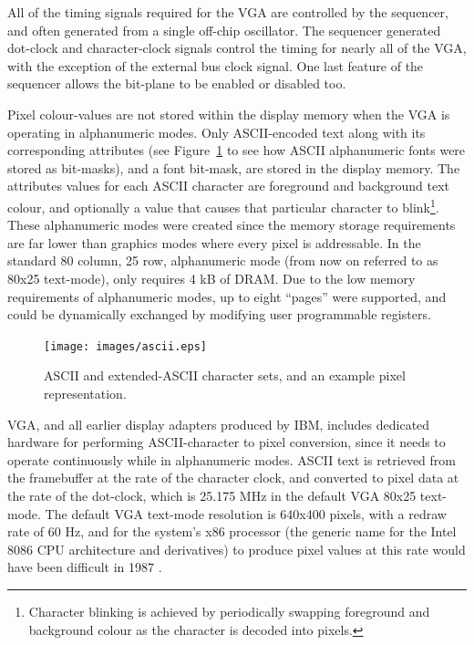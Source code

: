 All of the timing signals required for the VGA are controlled by the sequencer,
and often generated from a single off-chip oscillator. The sequencer generated
dot-clock and character-clock signals control the timing for nearly all of the
VGA, with the exception of the external bus clock signal. One last feature of the
sequencer allows the bit-plane to be enabled or disabled too.

Pixel colour-values are not stored within the display memory when the VGA is
operating in alphanumeric modes. Only ASCII-encoded text along with its
corresponding attributes (see Figure~\ref{INTRO_ASCII} to see how ASCII
alphanumeric fonts were stored as bit-masks), and a font bit-mask, are stored in
the display memory. The attributes values for each ASCII character are foreground
and background text colour, and optionally a value that causes that particular
character to blink\footnote{Character blinking is achieved by periodically
swapping foreground and background colour as the character is decoded into
pixels.}. These alphanumeric modes were created since the memory storage
requirements are far lower than graphics modes where every pixel is addressable.
In the standard 80 column, 25 row, alphanumeric mode (from now on referred to as
80x25 text-mode), only requires 4 kB of DRAM. Due to the low memory requirements
of alphanumeric modes, up to eight ``pages'' were supported, and could be
dynamically exchanged by modifying user programmable registers.

\begin{figure}[h!]
\begin{center}
\texttt{[image: images/ascii.eps]}
\caption[ASCII and extended-ASCII character set]{ASCII and extended-ASCII
character sets, and an example pixel representation.}
\label{INTRO_ASCII}
\end{center}
\end{figure}

VGA, and all earlier display adapters produced by IBM, includes dedicated
hardware for performing ASCII-character to pixel conversion, since it needs to
operate continuously while in alphanumeric modes. ASCII text is retrieved from
the framebuffer at the rate of the character clock, and converted to pixel data
at the rate of the dot-clock, which is 25.175 MHz in the default VGA 80x25
text-mode. The default VGA text-mode resolution is 640x400 pixels, with a redraw
rate of 60 Hz, and for the system's x86 processor (the generic name for the Intel
8086 CPU architecture and derivatives) to produce pixel values at this rate would have been difficult
in 1987 .

